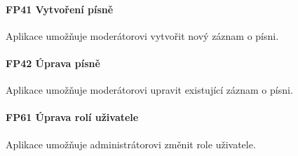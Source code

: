\noindent \begin{minipage}{\textwidth}
    \paragraph{FP41 Vytvoření písně} \label{FP41}
    \begin{smallindent}{}
        Aplikace umožňuje moderátorovi vytvořit nový záznam o písni.
    \end{smallindent}
\end{minipage}

\noindent \begin{minipage}{\textwidth}
    \paragraph{FP42 Úprava písně} \label{FP42}
    \begin{smallindent}{}
        Aplikace umožňuje moderátorovi upravit existující záznam o písni.
    \end{smallindent}
\end{minipage}

\noindent \begin{minipage}{\textwidth}
    \paragraph{FP61 Úprava rolí uživatele} \label{FP61}
    \begin{smallindent}{}
        Aplikace umožňuje administrátorovi změnit role uživatele.
    \end{smallindent}
\end{minipage}
